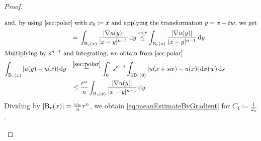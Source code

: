 \begin{proof}
\begin{enumerate}[i)]
\begin{align*}
        \intertext{and, by using \ref{sec:polar} with $x_0 \coloneqq x$ and applying the transformation $y = x + tw$, we get}
        &\;\;\,= \,\int_{\mathrm{B}_s(x)} \frac{|\nabla u(y)|}{|x - y|^{n - 1}} \, {\operatorname{d}\!{y}} 
        \overset{s < r}{\leq} \int_{\mathrm{B}_r(x)} \frac{|\nabla u(y)|}{|x - y|^{n - 1}} \, {\operatorname{d}\!{y}}. \\
        \intertext{Multiplying by $s^{n - 1}$ and integrating, we obtain from \ref{sec:polar}}
      \int_{\mathrm{B}_r(x)} |u(y) - u(x)| \, {\operatorname{d}\!{y}}
        &\;\;\,\overset{\ref{sec:polar}}{=} \int_0^r s^{n - 1} \int_{\partial\mathrm{B}_1(0)} |u(x + sw) - u(x)| \, {\operatorname{d}\!{\sigma}}(w) \, {\operatorname{d}\!{s}} \\
        &\;\;\;\leq \frac{r^n}{n} \int_{\mathrm{B}_r(x)} \frac{|\nabla u(y)|}{|x - y|^{n - 1}} \, {\operatorname{d}\!{y}}.
      \end{align*}
      Dividing by $|\mathrm{B}_r(x)| = \frac{\omega_n}{n} r^n$, we obtain \eqref{eq:meanEstimateByGradient} for $C_1 \coloneqq \frac{1}{\omega_n}$.


\end{enumerate}
\end{proof}
